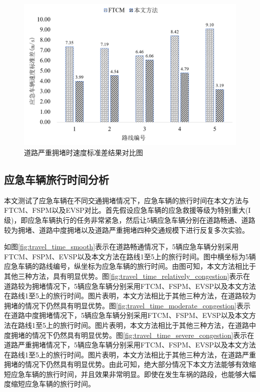 
\begin{figure}[H]
	\centering
	\includegraphics[width=\linewidth]{figures/std_severely.png}
	\caption{道路严重拥堵时速度标准差结果对比图}
	\label{fig:std_severely}
\end{figure}

\subsection{应急车辆旅行时间分析}
本文测试了应急车辆在不同交通拥堵情况下，应急车辆的旅行时间在本文方法与FTCM、FSPM以及EVSP对比。首先假设应急车辆的应急救援等级为特别重大(I级)，即应急车辆执行的任务非常紧急，然后让5辆应急车辆分别在道路畅通、道路较为拥堵、道路中度拥堵以及道路严重拥堵四种交通规模下进行反复多次实验。

如图\ref{fig:travel_time_smooth}表示在道路畅通情况下，5辆应急车辆分别采用FTCM、FSPM、EVSP以及本文方法在路线1至5上的旅行时间。图中横坐标为5辆应急车辆的路线编号，纵坐标为应急车辆的旅行时间。由图可知，本文方法相比于其他三种方法，具有明显优势。图\ref{fig:travel_time_relatively_congestion}表示在道路较为拥堵情况下，5辆应急车辆分别采用FTCM、FSPM、EVSP以及本文方法在路线1至5上的旅行时间。图片表明，本文方法相比于其他三种方法，在道路较为拥堵的情况下仍然具有明显优势。图\ref{fig:travel_time_moderate_congestion}表示在道路中度拥堵情况下，5辆应急车辆分别采用FTCM、FSPM、EVSP以及本文方法在路线1至5上的旅行时间。图片表明，本文方法相比于其他三种方法，在道路中度拥堵的情况下仍然具有明显优势。图\ref{fig:travel_time_severe_congestion}表示在道路严重拥堵情况下，5辆应急车辆分别采用FTCM、FSPM、EVSP以及本文方法在路线1至5上的旅行时间。图片表明，本文方法相比于其他三种方法，在道路严重拥堵的情况下仍然具有明显优势。由此可知，绝大部分情况下本文方法能够有效缩短应急车辆的旅行时间，并且效果非常明显。即使在发生车祸的路段，也能够大幅度缩短应急车辆的旅行时间。

